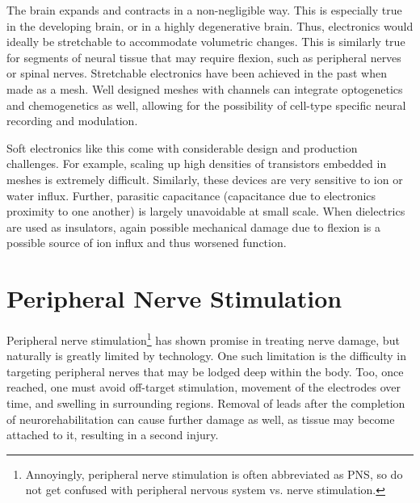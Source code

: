 The brain expands and contracts in a non-negligible way. This is especially true in the developing brain, or in a highly degenerative brain. Thus, electronics would ideally be stretchable to accommodate volumetric changes. This is similarly true for segments of neural tissue that may require flexion, such as peripheral nerves or spinal nerves. Stretchable electronics have been achieved in the past when made as a mesh. Well designed meshes with channels can integrate optogenetics and chemogenetics as well, allowing for the possibility of cell-type specific neural recording and modulation.\newline

Soft electronics like this come with considerable design and production challenges. For example, scaling up high densities of transistors embedded in meshes is extremely difficult. Similarly, these devices are very sensitive to ion or water influx. Further, parasitic capacitance (capacitance due to electronics proximity to one another) is largely unavoidable at small scale. When dielectrics are used as insulators, again possible mechanical damage due to flexion is a possible source of ion influx and thus worsened function. 


\chapter{Peripheral Nerve Stimulation} 
Peripheral nerve stimulation\footnote{Annoyingly, peripheral nerve stimulation is often abbreviated as PNS, so do not get confused with peripheral nervous system vs. nerve stimulation.} has shown promise in treating nerve damage, but naturally is greatly limited by technology. One such limitation is the difficulty in targeting peripheral nerves that may be lodged deep within the body. Too, once reached, one must avoid off-target stimulation, movement of the electrodes over time, and swelling in surrounding regions. Removal of leads after the completion of neurorehabilitation can cause further damage as well, as tissue may become attached to it, resulting in a second injury. 


